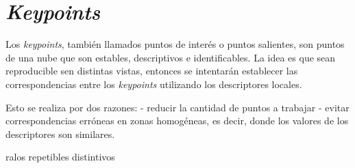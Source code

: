 \section{\emph{Keypoints}}
Los \emph{keypoints}, también llamados puntos de interés o puntos salientes, son puntos de una nube que son
estables,
descriptivos
e identificables.
La idea es que sean reproducible sen distintas vistas, entonces se intentarán establecer las correspondencias entre los \emph{keypoints} utilizando los descriptores locales.

Esto se realiza por dos razones:
- reducir la cantidad de puntos a trabajar
- evitar correspondencias erróneas en zonas homogéneas, es decir, donde los
valores de los descriptores son similares.


ralos
repetibles
distintivos
